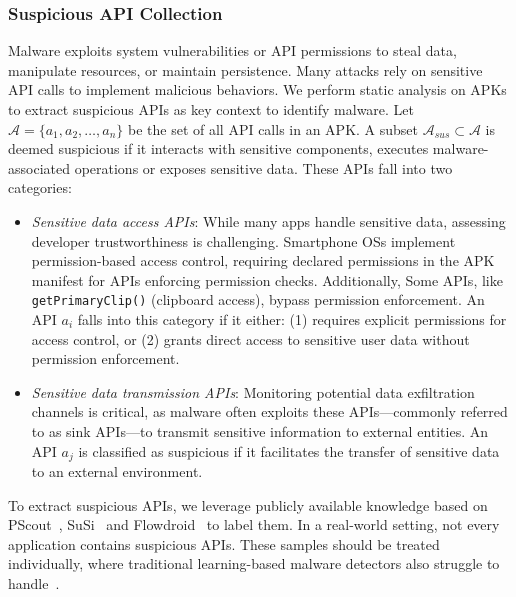 \subsubsection{Suspicious API Collection}
Malware exploits system vulnerabilities or API permissions to steal data, manipulate resources, or maintain persistence. Many attacks rely on sensitive API calls to implement malicious behaviors. We perform static analysis on APKs to extract suspicious APIs as key context to identify malware. Let $\mathcal{A} = \{a_1, a_2, \ldots, a_n\}$ be the set of all API calls in an APK. A subset $\mathcal{A}_{sus} \subset \mathcal{A}$ is deemed suspicious if it interacts with sensitive components, executes malware-associated operations or exposes sensitive data. These APIs fall into two categories:
\begin{itemize}
    \item \textit{Sensitive data access APIs}: While many apps handle sensitive data, assessing developer trustworthiness is challenging. Smartphone OSs implement permission-based access control, requiring declared permissions in the APK manifest for APIs enforcing permission checks. Additionally, Some APIs, like \verb|getPrimaryClip()| (clipboard access), bypass permission enforcement. An API $a_i$ falls into this category if it either: (1) requires explicit permissions for access control, or (2) grants direct access to sensitive user data without permission enforcement.
    \item \textit{Sensitive data transmission APIs}: Monitoring potential data exfiltration channels is critical, as malware often exploits these APIs—commonly referred to as sink APIs—to transmit sensitive information to external entities. An API $a_j$ is classified as suspicious if it facilitates the transfer of sensitive data to an external environment.
\end{itemize}

To extract suspicious APIs, we leverage publicly available knowledge based on PScout~\cite{pscout}, SuSi~\cite{susi} and Flowdroid~\cite{flowdroid} to label them. In a real-world setting, not every application contains suspicious APIs. These samples should be treated individually, where traditional learning-based malware detectors also struggle to handle~\cite{he2022msdroid}.



